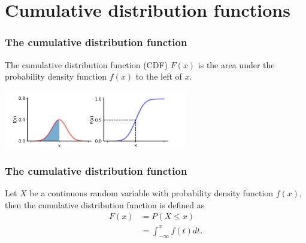 \documentclass[10pt]{beamer}
\begin{document}
\section{Cumulative distribution functions}
\begin{frame}
\frametitle{The cumulative distribution function}

The cumulative distribution function (CDF) $F(x)$ is the area under the probability density function $f(x)$ to the left of $x$.

\center \includegraphics[height=2.5cm]{images/pdf_cdf_1.png}

\end{frame}

\begin{frame}
\frametitle{The cumulative distribution function}


\vspace{.3cm}

\begin{definition} 
Let $X$ be a continuous random variable with probability density function $f(x)$, then the cumulative distribution function is defined as
\begin{align*}
F(x) &= P(X \leq x)\\
&= \int_{-\infty}^x f(t) dt.
\end{align*} 
\end{definition}

\vspace{0.5cm}


\end{frame}
\end{document}
